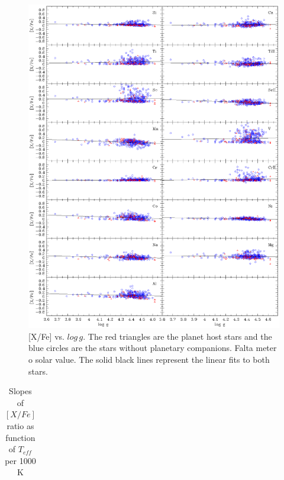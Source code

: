 \documentclass[dvips,12pt,a4paper]{report}
\begin{document}
{{\begin{figure}[h]
\centering
\includegraphics[height=15 cm]{pics/uncertain/xfelogg.eps}
\caption[depois]{[X/Fe] vs. $log\,g$. The red triangles are the planet host stars and the blue circles are the stars without planetary companions. Falta meter o solar value. The solid black lines represent the linear fits to both stars.}
\label{xfelogg}
\end{figure}

\begin{table}[h]
\label {slopes}
\centering
\caption[Slopes of metallicity in function of $T{eff}$ per 1000 K ]{Slopes of $[X/Fe]$ ratio as function of $T_{eff}$ per 1000 K } 
\begin{tabular}{ c r@{$\pm$}l r@{$\pm$}l | c r@{$\pm$}l r@{$\pm$}l}


\end{tabular}
\end{table}}}
\end{document}
